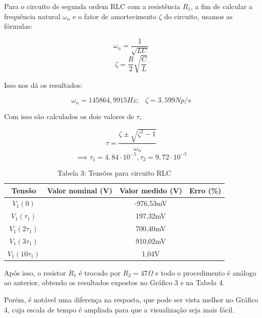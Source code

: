 \documentclass[a4 paper]{article}
\begin{document}
Para o circuito de segunda ordem RLC com a resistência $R_1$, a fim de calcular a frequência natural $\omega_n$ e o fator de amortecimento $\zeta$ do circuito, usamos as fórmulas:

\[\omega_n = \frac{1}{\sqrt{LC}}\]
\[\zeta = \frac{R}{2}\sqrt{\frac{C}{L}}\]

Isso nos dá os resultados:

\[\omega_n=145864,9915Hz;\hspace{10pt}\zeta=3,599Np/s\]

Com isso são calculados os dois valores de $\tau$, 

\[\tau = \frac{\zeta\pm\sqrt{\zeta^2-1}}{\omega_n}\]
\[\implies \tau_1=4,84\cdot10^{-5}, \tau_2=9,72\cdot10^{-7}\]


\vspace{5pt}
\begin{table}[h]
\centering
\begin{tabular}{|c|c|c|c|}
\hline
Tensão & Valor nominal (V) & Valor medido (V) & Erro (\%) \\\hline
$V_1(0)$ &  & -976,53mV & \\    \hline
$V_1(\tau_1)$ &  & 197,32mV & \\    \hline
$V_1(2\tau_1)$ &  & 700,40mV & \\\hline
$V_1(3\tau_1)$ &  & 910,02mV & \\\hline
$V_1(10\tau_1)$ &  & 1,04V & \\\hline
\end{tabular}
\caption*{Tabela 3: Tensões para circuito RLC}
\end{table}


\newpage
Após isso, o resistor $R_1$ é trocado por $R_2=47\Omega$ e todo o procedimento é análogo ao anterior, obtendo os resultados expostos no Gráfico 3 e na Tabela 4.


Porém, é notável uma diferença na resposta, que pode ser vista melhor no Gráfico 4, cuja escala de tempo é ampliada para que a visualização seja mais fácil.
\end{document}
